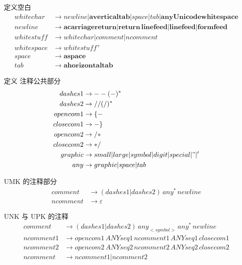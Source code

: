 \documentclass{ctexart}
\begin{document}
定义空白
\begin{align*}
whitechar &\rightarrow newline|\mathbf{a vertical tab}|space|tab|\mathbf{any Unicode whitespace} \\
newline &\rightarrow \mathbf{a carriage return}|\mathbf{return\,linefeed}|\mathbf{linefeed}|\mathbf{formfeed} \\
whitestuff &\rightarrow whitechar|comment|ncomment \\
whitespace &\rightarrow whitestuff^+ \\
space &\rightarrow \mathbf{a space} \\
tab &\rightarrow \mathbf{a horizontal tab}
\end{align*}

定义 注释公共部分
\begin{align*}
dashes1 &\rightarrow --(-)^* \\
dashes2 &\rightarrow //(/)^* \\
opencom1 &\rightarrow \{- \\
closecom1 &\rightarrow -\} \\
opencom2 &\rightarrow /* \\
closecom2 &\rightarrow */ \\
graphic &\rightarrow small|large|symbol|digit|special|"|' \\
any &\rightarrow graphic|space|tab \\
\end{align*}

UMK 的注释部分
\begin{align*}
comment &\rightarrow (dashes1|dashes2)\,any^*\,newline \\
ncomment &\rightarrow \varepsilon
\end{align*}

UNK 与 UPK 的注释
\begin{align*}
comment &\rightarrow (dashes1|dashes2)\,any_{<symbol>}\,any^*\,newline \\
ncomment1 &\rightarrow opencom1\,ANYseq1\,{ncomment1\,ANYseq1}\,closecom1 \\
ncomment2 &\rightarrow opencom2\,ANYseq2\,{ncomment2\,ANYseq2}\,closecom2 \\
ncomment &\rightarrow ncomment1|ncomment2
\end{align*}
\end{document}
